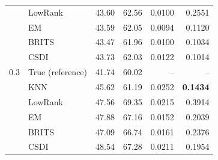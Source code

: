 \begin{table}[htbp]
\begin{tabular}{llrrrr}
     & LowRank & 43.60 & 62.56 & 0.0100 & 0.2551 \\
     & EM & 43.59 & 62.05 & 0.0094 & 0.1120 \\
     & BRITS & 43.47 & 61.96 & 0.0100 & 0.1034 \\
     & CSDI & 43.73 & 62.03 & 0.0122 & 0.1014 \\
    \midrule
    $0.3$ & True (reference) & 41.74 & 60.02 & -- & -- \\
     & KNN & 45.62 & 61.19 & 0.0252 & \textbf{0.1434} \\
     & LowRank & 47.56 & 69.35 & 0.0215 & 0.3914 \\
     & EM & 47.88 & 67.16 & 0.0152 & 0.2039 \\
     & BRITS & 47.09 & 66.74 & 0.0161 & 0.2376 \\
     & CSDI & 48.54 & 67.28 & 0.0211 & 0.1954 \\
    \bottomrule
  \end{tabular}
\end{table}

